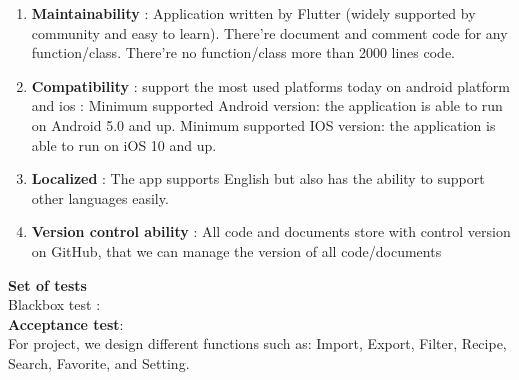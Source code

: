 \documentclass{article}
\begin{document}
\begin{enumerate}
        \item \textbf{Maintainability} : Application written by Flutter (widely supported by community and easy to learn). There’re document and comment code for any function/class. There’re no function/class more than 2000 lines code. 
        \item \textbf{Compatibility} : support the most used platforms today on android platform and ios :  Minimum supported Android version: the application is able to run on Android 5.0 and up.  Minimum supported IOS version: the application is able to run on iOS 10 and up. 
        \item \textbf{Localized} : The app supports English but also has the ability to support other languages easily. 
        \item \textbf{Version control ability} : All code and documents store with control version on GitHub, that we can manage the version of all code/documents 
    \end{enumerate}

\textbf{Set of tests} \\

    Blackbox test :   \\
    \textbf{Acceptance test}: \\
        For project, we design different functions such as: Import, Export, Filter, Recipe, Search, Favorite, and Setting. \\
\end{document}
